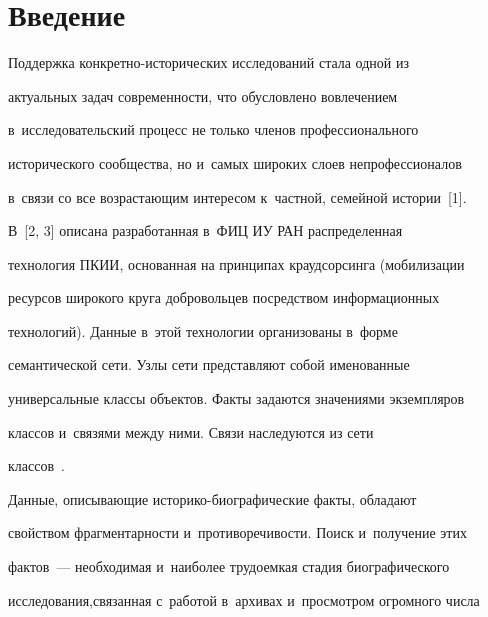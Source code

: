  \thispagestyle{headings}


 


 \vspace*{-18pt}





\section{Введение}





  Поддержка конкретно-исторических исследований стала одной из 


актуальных задач современности, что обусловлено вовлечением 


в~исследовательский процесс не только членов профессионального 


исторического сообщества, но и~самых широких слоев непрофессионалов 


в~связи со все возрастающим интересом к~частной, семейной истории~[1].


  


  В~[2, 3] описана разработанная в~ФИЦ ИУ РАН распределенная 


технология ПКИИ, основанная на принципах краудсорсинга (мобилизации 


ресурсов широкого круга добровольцев посредством информационных 


технологий). Данные в~этой технологии организованы в~форме 


семантической сети. Узлы сети представляют собой именованные 


универсальные классы объектов. Факты задаются значениями экземпляров 


классов и~связями между ними. Связи наследуются из сети  


классов~\cite{4-ad}.


  


  Данные, описывающие историко-биографические факты, обладают 


свойством фрагментарности и~противоречивости. Поиск и~получение этих 


фактов~--- необходимая и~наиболее трудоемкая стадия биографического 


исследования,\linebreak связанная с~работой в~архивах и~просмотром огромного числа 


